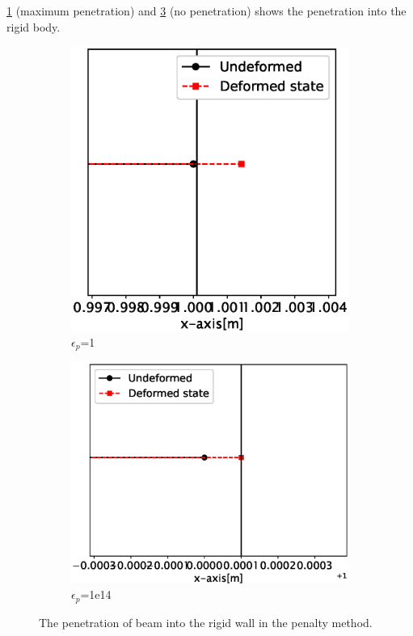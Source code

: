 \documentclass{article}
\begin{document}
\cref{fig:pm1} (maximum penetration) and \cref{fig:pm1e14} (no penetration) shows the penetration into the rigid body.

\begin{figure}[ht]
    \centering
        \begin{subfigure}{0.49\textwidth}
            \includegraphics[width=1\linewidth]{figures/pm1.eps} 
            \caption{$\epsilon_p$=1}
            \label{fig:pm1}
        \end{subfigure}
        \begin{subfigure}{0.49\textwidth}
            \includegraphics[width=1\linewidth]{figures/pm1e14.eps} 
            \caption{$\epsilon_p$=1e14}
            \label{fig:pm1e14}
        \end{subfigure}
    \caption{The penetration of beam into the rigid wall in the penalty method.}
\end{figure}


\newpage


\end{document}
